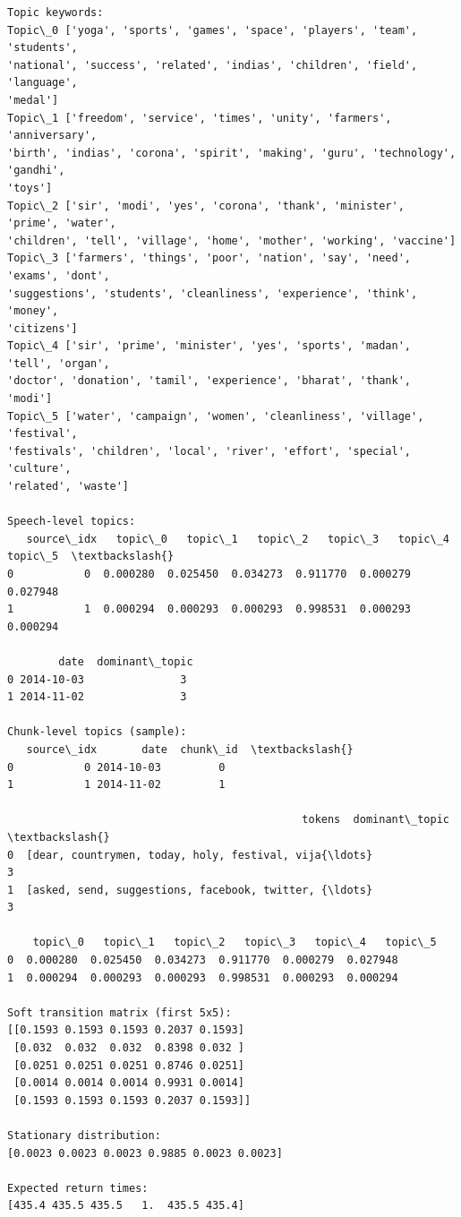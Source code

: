 \documentclass[11pt]{article}
\begin{document}
    \begin{Verbatim}[commandchars=\\\{\}]
Topic keywords:
Topic\_0 ['yoga', 'sports', 'games', 'space', 'players', 'team', 'students',
'national', 'success', 'related', 'indias', 'children', 'field', 'language',
'medal']
Topic\_1 ['freedom', 'service', 'times', 'unity', 'farmers', 'anniversary',
'birth', 'indias', 'corona', 'spirit', 'making', 'guru', 'technology', 'gandhi',
'toys']
Topic\_2 ['sir', 'modi', 'yes', 'corona', 'thank', 'minister', 'prime', 'water',
'children', 'tell', 'village', 'home', 'mother', 'working', 'vaccine']
Topic\_3 ['farmers', 'things', 'poor', 'nation', 'say', 'need', 'exams', 'dont',
'suggestions', 'students', 'cleanliness', 'experience', 'think', 'money',
'citizens']
Topic\_4 ['sir', 'prime', 'minister', 'yes', 'sports', 'madan', 'tell', 'organ',
'doctor', 'donation', 'tamil', 'experience', 'bharat', 'thank', 'modi']
Topic\_5 ['water', 'campaign', 'women', 'cleanliness', 'village', 'festival',
'festivals', 'children', 'local', 'river', 'effort', 'special', 'culture',
'related', 'waste']

Speech-level topics:
   source\_idx   topic\_0   topic\_1   topic\_2   topic\_3   topic\_4   topic\_5  \textbackslash{}
0           0  0.000280  0.025450  0.034273  0.911770  0.000279  0.027948
1           1  0.000294  0.000293  0.000293  0.998531  0.000293  0.000294

        date  dominant\_topic
0 2014-10-03               3
1 2014-11-02               3

Chunk-level topics (sample):
   source\_idx       date  chunk\_id  \textbackslash{}
0           0 2014-10-03         0
1           1 2014-11-02         1

                                              tokens  dominant\_topic  \textbackslash{}
0  [dear, countrymen, today, holy, festival, vija{\ldots}               3
1  [asked, send, suggestions, facebook, twitter, {\ldots}               3

    topic\_0   topic\_1   topic\_2   topic\_3   topic\_4   topic\_5
0  0.000280  0.025450  0.034273  0.911770  0.000279  0.027948
1  0.000294  0.000293  0.000293  0.998531  0.000293  0.000294

Soft transition matrix (first 5x5):
[[0.1593 0.1593 0.1593 0.2037 0.1593]
 [0.032  0.032  0.032  0.8398 0.032 ]
 [0.0251 0.0251 0.0251 0.8746 0.0251]
 [0.0014 0.0014 0.0014 0.9931 0.0014]
 [0.1593 0.1593 0.1593 0.2037 0.1593]]

Stationary distribution:
[0.0023 0.0023 0.0023 0.9885 0.0023 0.0023]

Expected return times:
[435.4 435.5 435.5   1.  435.5 435.4]
    \end{Verbatim}
\end{document}
